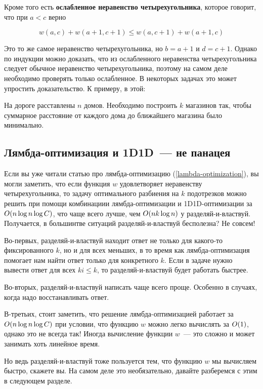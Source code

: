 Кроме того есть \textbf{ослабленное неравенство четырехугольника}, которое говорит, что при $a < c$ верно

$$w(a, c) + w(a + 1, c + 1) \le w(a, c + 1) + w(a + 1, c)$$

Это то же самое неравенство четырехугольника, но $b = a + 1$ и $d = c + 1$. Однако по индукции можно доказать, что из ослабленного неравенства четырехугольника следует обычное неравенство четырехугольника, поэтому на самом деле необходимо проверять только ослабленное. В некоторых задачах это может упростить доказательство. К примеру, в этой:

\begin{problem}
    На дороге расставлены $n$ домов. Необходимо построить $k$ магазинов так, чтобы суммарное расстояние от каждого дома до ближайшего магазина было минимально.
\end{problem}

\subsection{Лямбда-оптимизация и 1D1D~--- не панацея}

Если вы уже читали статью про лямбда-оптимизацию (\ref{lambda-optimization}), вы могли заметить, что если функция $w$ удовлетворяет неравенству четырехугольника, то задачу оптимального разбиения на $k$ подотрезков можно решить при помощи комбинациии лямбда-оптимизации и 1D1D-оптимизации за $O(n \log n \log C)$, что чаще всего лучше, чем $O(n k \log n)$ у разделяй-и-властвуй. Получается, в большинтве ситуаций разделяй-и-властвуй бесполезна? Не совсем!

Во-первых, разделяй-и-властвуй находит ответ не только для какого-то фиксированного $k$, но и для всех меньших, в то время как лямбда-оптимизация помогает нам найти ответ только для конкретного $k$. Если в задаче нужно вывести ответ для всех $ki \le k$, то разделяй-и-властвуй будет работать быстрее.

Во-вторых, разделяй-и-властвуй написать чаще всего проще. Особенно в случаях, когда надо восстанавливать ответ.

В-третьих, стоит заметить, что решение лямбда-оптимизацией работает за $O(n \log n \log C)$ при условии, что функцию $w$ можно легко вычислять за $O(1)$, однако это не всегда так! Иногда вычисление функции $w$~--- это сложно и может занимать хоть линейное время.

Но ведь разделяй-и-властвуй тоже пользуется тем, что функцию $w$ мы вычисляем быстро, скажете вы. На самом деле это необязательно, давайте разберемся с этим в следующем разделе.

